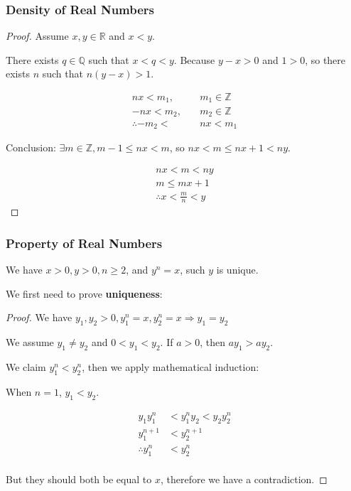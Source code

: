 \documentclass{article}
\begin{document}
    \subsubsection{Density of Real Numbers}
    
    \begin{proof}
        Assume $x, y \in \mathbb{R}$ and $x < y$.
        
        There exists $q \in \mathbb{Q}$ such that $x < q < y$. Because $y - x > 0$ and $1 > 0$, so there exists $n$ such that $n(y - x) > 1$.
        
        \begin{align*}
            nx < m_{1}, \quad & m_{1} \in \mathbb{Z} \\
            -nx < m_{2}, \quad & m_{2} \in \mathbb{Z} \\
            \therefore -m_{2} < &nx < m_{1}
        \end{align*}
        
        Conclusion: $\exists m \in \mathbb{Z}, m - 1 \leq nx < m$, so $nx < m \leq nx + 1 < ny$.
        
        \begin{align*}
            nx < m < ny \\
            m \leq mx + 1 \\
            \therefore x < \frac{m}{n} < y
        \end{align*}
    \end{proof}

    \subsubsection{Property of Real Numbers}
    
    We have $x > 0, y > 0, n \geq 2$, and $y^{n} = x$, such $y$ is unique.
    
    We first need to prove \textbf{uniqueness}:
    
    \begin{proof}
    We have $y_{1}, y_{2} > 0, y_{1}^{n} = x, y_{2}^{n} = x \Rightarrow y_{1} = y_{2}$
    
    We assume $y_{1} \neq y_{2}$ and $0 < y_{1} < y_{2}$. If $a > 0$, then $ay_{1} > ay_{2}$.
    
    We claim $y_{1}^{n} < y_{2}^{n}$, then we apply mathematical induction:
    
    When $n = 1$, $y_{1} < y_{2}$.
    
    \begin{align*}
        y_{1}y_{1}^{n} &< y_{1}^{n}y_{2} < y_{2}y_{2}^{n} \\
        y_{1}^{n + 1} &< y_{2}^{n + 1} \\
        \therefore y_{1}^{n} &< y_{2}^{n} \\
    \end{align*}
    
    But they should both be equal to $x$, therefore we have a contradiction.
    \end{proof}
    
\end{document}
